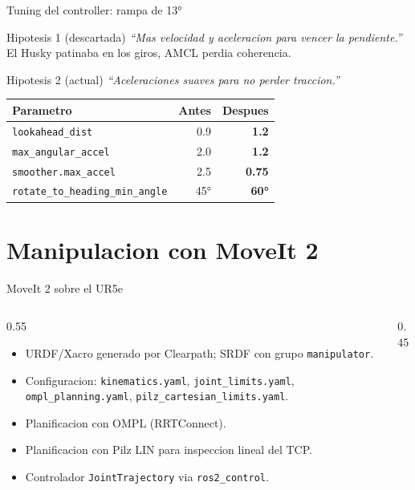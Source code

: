 \documentclass[10pt,aspectratio=169]{beamer}
\begin{document}
\begin{frame}{Tuning del controller: rampa de 13°}
  \begin{block}{Hipotesis 1 (descartada)}
    \emph{``Mas velocidad y aceleracion para vencer la pendiente.''} El Husky patinaba en los giros, AMCL perdia coherencia.
  \end{block}
  \begin{block}{Hipotesis 2 (actual)}
    \emph{``Aceleraciones suaves para no perder traccion.''}
  \end{block}
  \scriptsize
  \begin{tabular}{lrr}
    \toprule
    Parametro & Antes & Despues \\
    \midrule
    \texttt{lookahead\_dist}        & 0.9  & \textbf{1.2}  \\
    \texttt{max\_angular\_accel}    & 2.0  & \textbf{1.2}  \\
    \texttt{smoother.max\_accel}    & 2.5  & \textbf{0.75} \\
    \texttt{rotate\_to\_heading\_min\_angle} & 45° & \textbf{60°} \\
    \bottomrule
  \end{tabular}
\end{frame}

\section{Manipulacion con MoveIt 2}

\begin{frame}{MoveIt 2 sobre el UR5e}
  \begin{columns}
    \begin{column}{0.55\textwidth}
      \begin{itemize}
        \item URDF/Xacro generado por Clearpath; SRDF con grupo \texttt{manipulator}.
        \item Configuracion: \texttt{kinematics.yaml}, \texttt{joint\_limits.yaml}, \texttt{ompl\_planning.yaml}, \texttt{pilz\_cartesian\_limits.yaml}.
        \item Planificacion  con OMPL (RRTConnect).
        \item Planificacion  con Pilz LIN para inspeccion lineal del TCP.
        \item Controlador \texttt{JointTrajectory} via \texttt{ros2\_control}.
      \end{itemize}
    \end{column}
    \begin{column}{0.45\textwidth}
    \end{column}
  \end{columns}
\end{frame}
\end{document}
